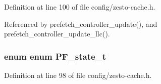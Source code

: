 Definition at line 100 of file config/zesto-cache.h.

Referenced by prefetch\_\-controller\_\-update(), and prefetch\_\-controller\_\-update\_\-llc().
\subsubsection[{PF\_\-state\_\-t}]{\setlength{\rightskip}{0pt plus 5cm}enum enum {\bf PF\_\-state\_\-t}}\label{config_2zesto-cache_8h_5a64ff16cc4f7633804dcaa767f3a1f6}




Definition at line 98 of file config/zesto-cache.h.